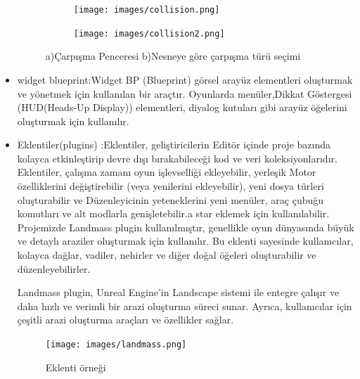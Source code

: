\documentclass[12pt,a4paper]{article}
\begin{document}
\begin{itemize}
\begin{center}
\begin{figure}[htbp!]
\begin{subfigure}[t]{0.7\textwidth}
		 	 			\label{fig:ornek1}
		 	 			
		 	 			\centering
		 	 			\texttt{[image: images/collision.png]}
		 	 			\caption{}
		 	 		\end{subfigure}
		 	 		\begin{subfigure}[t]{0.7\textwidth}
		 	 			
		 	 			\label{fig:ornek2}
		 	 			
		 	 			\centering
		 	 			\texttt{[image: images/collision2.png]}
		 	 			\caption{}
		 	 		\end{subfigure}
		 	 		\caption{a)Çarpışma Penceresi   b)Nesneye göre çarpışma türü seçimi}
		 	 		\label{fig:ornekler}
		 	 	\end{figure}
		 	 \end{center}
		
		 	 \item widget blueprint:Widget BP (Blueprint) görsel arayüz elementleri oluşturmak ve yönetmek için kullanılan bir araçtır. Oyunlarda menüler,Dikkat Göstergesi (HUD(Heads-Up Display)) elementleri, diyalog kutuları gibi arayüz öğelerini oluşturmak için kullanılır.
		 	 \item Eklentiler(plugins) :Eklentiler, geliştiricilerin Editör içinde proje bazında kolayca etkinleştirip devre dışı bırakabileceği kod ve veri koleksiyonlarıdır. Eklentiler, çalışma zamanı oyun işlevselliği ekleyebilir, yerleşik Motor özelliklerini değiştirebilir (veya yenilerini ekleyebilir), yeni dosya türleri oluşturabilir ve Düzenleyicinin yeteneklerini yeni menüler, araç çubuğu komutları ve alt modlarla genişletebilir.a star eklemek için kullanılabilir.
		 	 Projemizde Landmass plugin kullanılmıştır, genellikle oyun dünyasında büyük ve detaylı araziler oluşturmak için kullanılır. Bu eklenti sayesinde kullanıcılar, kolayca dağlar, vadiler, nehirler ve diğer doğal öğeleri oluşturabilir ve düzenleyebilirler.
		 	 
		 	 Landmass plugin, Unreal Engine'in Landscape sistemi ile entegre çalışır ve daha hızlı ve verimli bir arazi oluşturma süreci sunar. Ayrıca, kullanıcılar için çeşitli arazi oluşturma araçları ve özellikler sağlar.
		 	  \begin{center}
		 	 	\begin{figure}[!htbp]
		 	 		\texttt{[image: images/landmass.png]}\newline
		 	 		\caption{Eklenti  örneği}
		 	 		\label{fig:ornek}
		 	 	\end{figure}
		 	\end{center}
		 	 	

\end{itemize}
\end{document}
